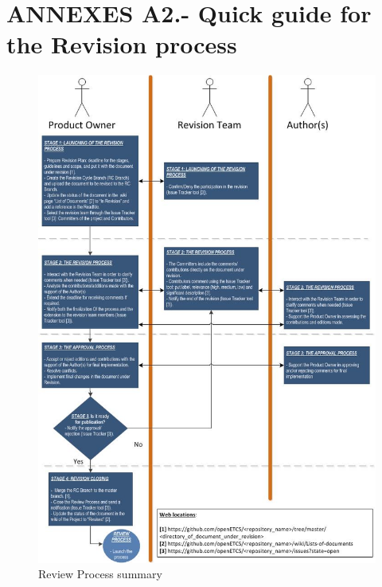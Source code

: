 \documentclass{template/openetcs_article}
\begin{document}
\section{ANNEXES A2.- Quick guide for the Revision process}

\begin{figure}[H]
\centering
\includegraphics[scale=0.83]{./figures/RevisionProcessSummary.JPG}
\caption{Review Process summary}
\end{figure}
\end{document}
